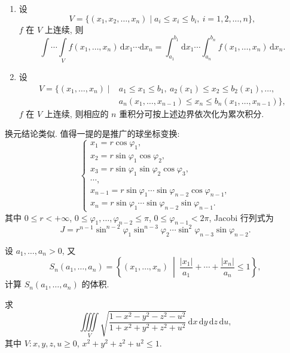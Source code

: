 \documentclass[../../数学分析培优讲义.tex]{subfiles}
\begin{document}
\begin{theorem}
\begin{enumerate}[label=(\arabic*)]
    \item 设
    \[
        V=\{(x_1,x_2,\ldots,x_n)\mid a_i\leq x_i\leq b_i,\ i=1,2,\ldots,n\},
    \]
    $f$ 在 $V$ 上连续, 则
    \[
        \int\cdots\int\limits_V f(x_1,\ldots,x_n)\,\mathrm{d}x_1\cdots\mathrm{d}x_n
        =\int_{a_1}^{b_1}\mathrm{d}x_1\cdots\int_{a_n}^{b_n}f(x_1,\ldots,x_n)\,\mathrm{d}x_n.
    \]

    \item 设
    \[
    \begin{aligned}
        V=\{(x_1,\ldots,x_n)\mid{}&a_1\leq x_1\leq b_1,\ a_2(x_1)\leq x_2\leq b_2(x_1),\ldots,\\
        &a_n(x_1,\ldots,x_{n-1})\leq x_n\leq b_n(x_1,\ldots,x_{n-1})\},
    \end{aligned}
    \]
    $f$ 在 $V$ 上连续, 则相应的 $n$ 重积分可按上述边界依次化为累次积分.
\end{enumerate}
\end{theorem}

换元结论类似. 值得一提的是推广的球坐标变换:
\[
\begin{cases}
    x_1=r\cos\varphi_1,\\
    x_2=r\sin\varphi_1\cos\varphi_2,\\
    x_3=r\sin\varphi_1\sin\varphi_2\cos\varphi_3,\\
    \cdots,\\
    x_{n-1}=r\sin\varphi_1\cdots\sin\varphi_{n-2}\cos\varphi_{n-1},\\
    x_n=r\sin\varphi_1\cdots\sin\varphi_{n-2}\sin\varphi_{n-1}.
\end{cases}
\]
其中 $0\leq r<+\infty$, $0\leq\varphi_1,\ldots,\varphi_{n-2}\leq\pi$, $0\leq\varphi_{n-1}<2\pi$, Jacobi 行列式为
\[
    J=r^{n-1}\sin^{n-2}\varphi_1\sin^{n-3}\varphi_2\cdots\sin^2\varphi_{n-3}\sin\varphi_{n-2}.
\]

\begin{example}
设 $a_1,\ldots,a_n>0$, 又
\[
    S_n(a_1,\ldots,a_n)=\left\{(x_1,\ldots,x_n)\ \middle|\ \dfrac{|x_1|}{a_1}+\cdots+\dfrac{|x_n|}{a_n}\leq1\right\},
\]
计算 $S_n(a_1,\ldots,a_n)$ 的体积.
\end{example}
\exampleblank

\begin{example}
求
\[
    \iiiint\limits_V\sqrt{\dfrac{1-x^2-y^2-z^2-u^2}{1+x^2+y^2+z^2+u^2}}\,
    \mathrm{d}x\,\mathrm{d}y\,\mathrm{d}z\,\mathrm{d}u,
\]
其中 $V:x,y,z,u\geq0$, $x^2+y^2+z^2+u^2\leq1$.
\end{example}
\exampleblank
\end{document}
